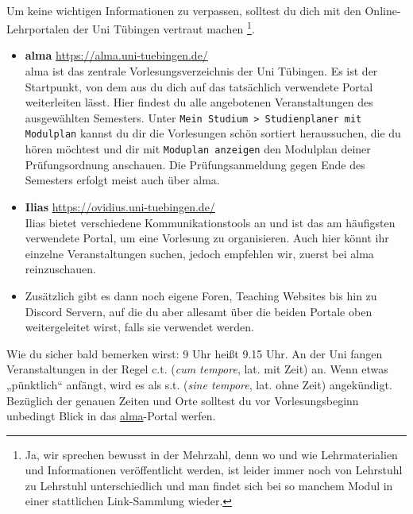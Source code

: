 ~\\

Um keine wichtigen Informationen zu verpassen, solltest du dich mit den Online-Lehrportalen der Uni Tübingen vertraut machen
\footnote{Ja, wir sprechen bewusst in der Mehrzahl, denn wo und wie Lehrmaterialien und Informationen veröffentlicht werden, ist leider immer noch 
von Lehrstuhl zu Lehrstuhl unterschiedlich und man findet sich bei so manchem Modul in einer stattlichen Link-Sammlung wieder.}.
\begin{itemize}
	\item \textbf{\hypertarget{alma}{alma}} \url{https://alma.uni-tuebingen.de/} \\
	alma ist das zentrale Vorlesungsverzeichnis der Uni Tübingen. Es ist der Startpunkt, von dem aus du dich auf das tatsächlich verwendete Portal weiterleiten lässt.
	Hier findest du alle angebotenen Veranstaltungen des ausgewählten Semesters. Unter \texttt{Mein Studium > Studienplaner mit Modulplan} kannst du dir die Vorlesungen schön sortiert heraussuchen, die du hören möchtest und dir mit \texttt{Moduplan anzeigen} den Modulplan deiner Prüfungsordnung anschauen. Die Prüfungsanmeldung gegen Ende des Semesters erfolgt meist auch über alma.  
	\item \textbf{Ilias} \url{https://ovidius.uni-tuebingen.de/} \\
	Ilias bietet verschiedene Kommunikationstools an und ist das am häufigsten verwendete Portal, um eine Vorlesung zu organisieren. Auch hier könnt ihr einzelne Veranstaltungen suchen, jedoch empfehlen wir, zuerst bei alma reinzuschauen. 
	\item Zusätzlich gibt es dann noch eigene Foren, Teaching Websites bis hin zu Discord Servern, auf die du aber allesamt über die beiden Portale oben weitergeleitet wirst, falls sie verwendet werden.
	
\end{itemize}
Wie du sicher bald bemerken wirst: 9 Uhr heißt 9.15 Uhr. An der Uni fangen Veranstaltungen in der Regel c.t. (\textit{cum
tempore}, lat. \glqq mit Zeit\grqq) an. Wenn etwas „pünktlich“ anfängt, wird es als s.t. (\textit{sine tempore}, lat. \glqq ohne
Zeit\grqq) angekündigt.
Bezüglich der genauen Zeiten und Orte solltest du vor Vorlesungsbeginn unbedingt Blick in das \hyperlink{alma}{alma}-Portal werfen.


